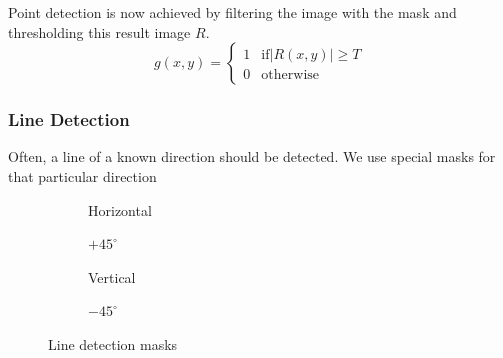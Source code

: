 Point detection is now achieved by filtering the image with the mask and thresholding this result image $R$.
\[
	g(x,y) =
	\begin{cases}
		1 & \text{if} |R(x,y)| \geq T \\
		0 & \text{otherwise}
	\end{cases}
\]

\subsubsection{Line Detection}
Often, a line of a known direction should be detected. We use special masks for that particular direction

\begin{figure}[h]
	\centering
	\begin{subfigure}[b]{0.2\textwidth}
		\centering
		\caption{Horizontal}
	\end{subfigure}
	\begin{subfigure}[b]{0.2\textwidth}
		\centering
		\caption{$+45^\circ$}
	\end{subfigure}
	\begin{subfigure}[b]{0.2\textwidth}
		\centering
		\caption{Vertical}
	\end{subfigure}
	\begin{subfigure}[b]{0.2\textwidth}
		\centering
		\caption{$-45^\circ$}
	\end{subfigure}
	\caption{Line detection masks}
\end{figure}


